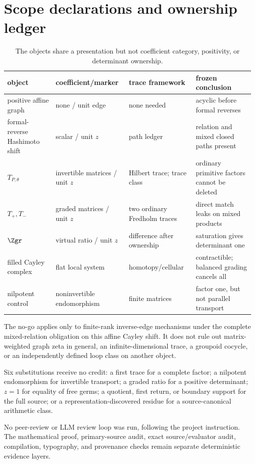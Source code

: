 \section{Scope declarations and ownership ledger}

\begin{table}[H]
\centering
\scriptsize
\begin{tabularx}{\textwidth}{@{}L{0.22\textwidth}L{0.19\textwidth}L{0.22\textwidth}Y@{}}
\toprule
object & coefficient/marker & trace framework & frozen conclusion \\
\midrule
positive affine graph & none / unit edge & none needed & acyclic before formal reverses \\
formal-reverse Hashimoto shift & scalar / unit $z$ & path ledger & relation and mixed closed paths present \\
$T_{P,\theta}$ & invertible matrices / unit $z$ & Hilbert trace; trace class & ordinary primitive factors cannot be deleted \\
$T_+,T_-$ & graded matrices / unit $z$ & two ordinary Fredholm traces & direct match leaks on mixed products \\
$\Zgr$ & virtual ratio / unit $z$ & difference after ownership & saturation gives determinant one \\
filled Cayley complex & flat local system & homotopy/cellular & contractible; balanced grading cancels all \\
nilpotent control & noninvertible endomorphism & finite matrices & factor one, but not parallel transport \\
\bottomrule
\end{tabularx}
\caption{The objects share a presentation but not coefficient category,
positivity, or determinant ownership.}
\label{tab:ownership}
\end{table}

The no-go applies only to finite-rank inverse-edge mechanisms under the
complete mixed-relation obligation on this affine Cayley shift.  It does not
rule out matrix-weighted graph zeta in general, an infinite-dimensional trace,
a groupoid cocycle, or an independently defined loop class on another object.

Six substitutions receive no credit: a first trace for a complete factor; a
nilpotent endomorphism for invertible transport; a graded ratio for a positive
determinant; $z=1$ for equality of free germs; a quotient, first return, or
boundary support for the full source; or a representation-discovered residue
for a source-canonical arithmetic class.

No peer-review or LLM review loop was run, following the project instruction.
The mathematical proof, primary-source audit, exact source/evaluator audit,
compilation, typography, and provenance checks remain separate deterministic
evidence layers.
